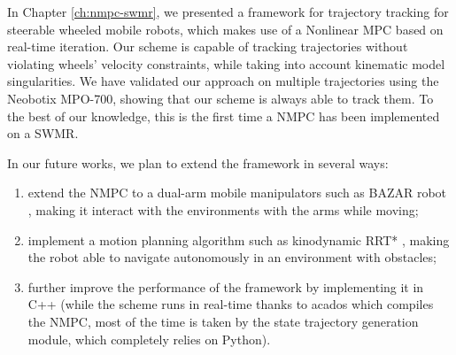 \medskip

In Chapter \ref{ch:nmpc-swmr}, we presented a framework for trajectory tracking
for steerable wheeled mobile robots, which makes use of a Nonlinear MPC based
on real-time iteration. Our scheme is capable of tracking trajectories without
violating wheels' velocity constraints, while taking into account kinematic
model singularities. We have validated our approach on multiple trajectories
using the Neobotix MPO-700, showing that our scheme is always able to track
them. To the best of our knowledge, this is the first time a NMPC has been
implemented on a SWMR.

In our future works, we plan to extend the framework in several ways:
\begin{enumerate}
    \item extend the NMPC to a dual-arm mobile manipulators such as BAZAR robot
        \cite{Cherubini2019ACR}, making it interact with the environments with
        the arms while moving;
    \item implement a motion planning algorithm such as kinodynamic RRT*
        \cite{Webb2013KinodynamicRRTstar}, making the robot able to navigate
        autonomously in an environment with obstacles;
    \item further improve the performance of the framework by implementing it
        in C++ (while the scheme runs in real-time thanks to acados which
        compiles the NMPC, most of the time is taken by the state
        trajectory generation module, which completely relies on Python).
\end{enumerate}
